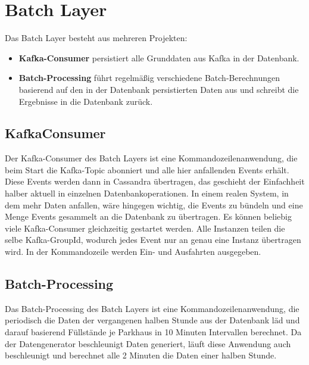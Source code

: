 \section{Batch Layer}
Das Batch Layer besteht aus mehreren Projekten:
\begin{itemize}
    \item \textbf{Kafka-Consumer} persistiert alle Grunddaten aus Kafka in der Datenbank.
    \item \textbf{Batch-Processing} führt regelmäßig verschiedene Batch-Berechnungen basierend auf den in der Datenbank persistierten Daten aus und schreibt die Ergebnisse in die Datenbank zurück. 
\end{itemize}

\subsection{KafkaConsumer}
Der Kafka-Consumer des Batch Layers ist eine Kommandozeilenanwendung, die beim Start die Kafka-Topic  abonniert und alle hier anfallenden Events erhält.
Diese Events werden dann in Cassandra übertragen, das geschieht der Einfachheit halber aktuell in einzelnen Datenbankoperationen.
In einem realen System, in dem mehr Daten anfallen, wäre hingegen wichtig, die Events zu bündeln und eine Menge Events gesammelt an die Datenbank zu übertragen.
Es können beliebig viele Kafka-Consumer gleichzeitig gestartet werden.
Alle Instanzen teilen die selbe Kafka-GroupId, wodurch jedes Event nur an genau eine Instanz übertragen wird.
In der Kommandozeile werden Ein- und Ausfahrten ausgegeben.

\subsection{Batch-Processing}
Das Batch-Processing des Batch Layers ist eine Kommandozeilenanwendung, die periodisch die Daten der vergangenen halben Stunde aus der Datenbank läd und darauf basierend Füllstände je Parkhaus in 10 Minuten Intervallen berechnet.
Da der Datengenerator beschleunigt Daten generiert, läuft diese Anwendung auch beschleunigt und berechnet alle 2 Minuten die Daten einer halben Stunde.



